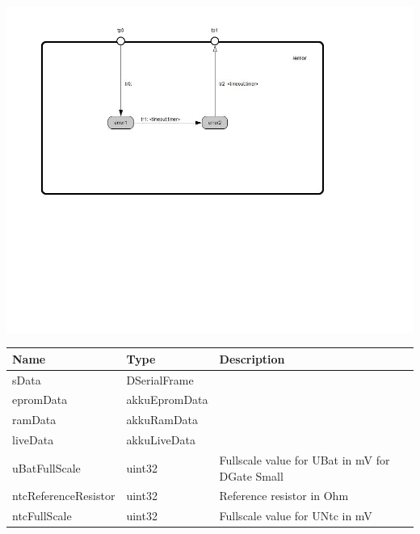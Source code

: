 \begin{par}

\end{par}

{
\centering{}
\includegraphics[width=1.0\textwidth]{./images/AAkkuSimu_error_behavior.jpg}
}

\begin{par}

\end{par}
	

\begin{tabular}[ht]{|l|l|p{8cm}|}
\hline
\textbf{Name} & \textbf{Type} & \textbf{Description}\\
\hline
sData & DSerialFrame & \\
\hline
epromData & akkuEpromData & \\
\hline
ramData & akkuRamData & \\
\hline
liveData & akkuLiveData & \\
\hline
uBatFullScale & uint32 & %
Fullscale value for UBat in mV for DGate Small
\\
\hline
ntcReferenceResistor & uint32 & %
Reference resistor in Ohm
\\
\hline
ntcFullScale & uint32 & %
Fullscale value for UNtc in mV
\\
\hline
\end{tabular}

